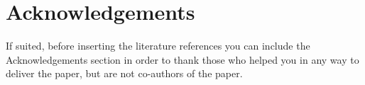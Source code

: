 \documentclass[10pt, a4paper]{article}
\begin{document}
%
%
%
%
%

\section*{Acknowledgements}

If suited, before inserting the literature references you can include the Acknowledgements section in order to thank those who helped you in any way to deliver the paper, but are not co-authors of the paper.


 
\end{document}
